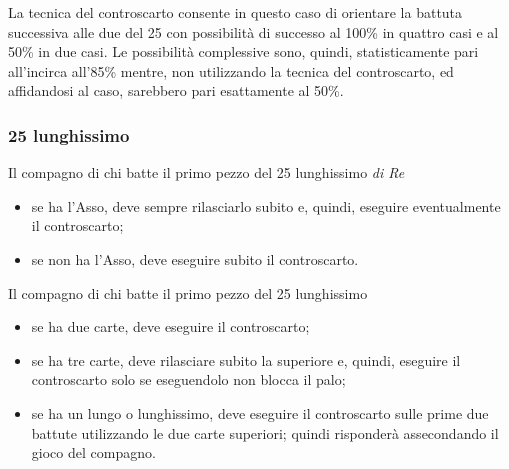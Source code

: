 \documentclass[italian,a4paper]{article}
\newenvironment{packeditem}{
\begin{itemize}
  \setlength{\itemsep}{1pt}
  \setlength{\parskip}{0pt}
  \setlength{\parsep}{0pt}
}{\end{itemize}}
\begin{document}
La tecnica del controscarto consente in questo caso di orientare la battuta successiva alle due del 25 con possibilità di successo al 100\% in quattro casi e al 50\% in due casi. Le possibilità complessive sono, quindi, statisticamente pari all'incirca all'85\% mentre, non utilizzando la tecnica del controscarto, ed affidandosi al caso, sarebbero pari esattamente al 50\%.
\subsubsection{25 lunghissimo}
Il compagno di chi batte il primo pezzo del 25 lunghissimo
\emph{di Re}
 \begin{packeditem}
     \item se ha l'Asso, deve sempre rilasciarlo subito e, quindi, eseguire eventualmente il controscarto;
     \item se non ha l'Asso, deve eseguire subito il controscarto.
 \end{packeditem}
Il compagno di chi batte il primo pezzo del 25 lunghissimo
\begin{packeditem}
    \item  se ha due carte, deve eseguire il controscarto;
    \item se ha tre carte, deve rilasciare subito la superiore e, quindi, eseguire il controscarto solo se eseguendolo non blocca il palo;
    \item se ha un lungo o lunghissimo, deve eseguire il controscarto sulle prime due battute utilizzando le due carte superiori; quindi risponderà assecondando il gioco del compagno.
\end{packeditem}
\end{document}
